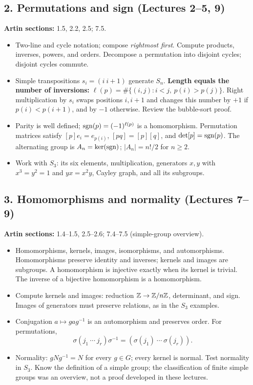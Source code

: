 \documentclass[11pt,reqno]{amsart}
\begin{document}
\subsection*{2. Permutations and sign (Lectures 2--5, 9)}
\noindent\textbf{Artin sections:} 1.5, 2.2, 2.5; 7.5.\par
\begin{itemize}
\item Two-line and cycle notation; compose \emph{rightmost first}.
Compute products, inverses, powers, and orders. Decompose a permutation into disjoint
cycles; disjoint cycles commute.
\item Simple transpositions $s_i=(i\ i+1)$ generate $S_n$.
\textbf{Length equals the number of inversions:}
$\ell(p)=\#\{(i,j):i<j,\ p(i)>p(j)\}$.
Right multiplication by $s_i$ swaps positions $i,i+1$ and changes this number by
$+1$ if $p(i)<p(i+1)$, and by $-1$ otherwise. Review the bubble-sort proof.
\item Parity is well defined; $\operatorname{sgn}(p)=(-1)^{\ell(p)}$ is a homomorphism.
Permutation matrices satisfy $[p]e_i=e_{p(i)}$, $[pq]=[p][q]$, and
$\det[p]=\operatorname{sgn}(p)$. The alternating group is $A_n=\ker(\operatorname{sgn})$;
$|A_n|=n!/2$ for $n\geq2$.
\item Work with $S_3$: its six elements, multiplication, generators
$x,y$ with $x^3=y^2=1$ and $yx=x^2y$, Cayley graph, and all its subgroups.
\end{itemize}

\subsection*{3. Homomorphisms and normality (Lectures 7--9)}
\noindent\textbf{Artin sections:} 1.4--1.5, 2.5--2.6; 7.4--7.5 (simple-group overview).\par
\begin{itemize}
\item Homomorphisms, kernels, images, isomorphisms, and automorphisms.
Homomorphisms preserve identity and inverses; kernels and images are subgroups.
A homomorphism is injective exactly when its kernel is trivial.
The inverse of a bijective homomorphism is a homomorphism.
\item Compute kernels and images: reduction $\mathbb{Z}\to\mathbb{Z}/n\mathbb{Z}$, determinant,
and sign. Images of generators must preserve relations, as in the $S_3$ examples.
\item Conjugation $a\mapsto gag^{-1}$ is an automorphism and preserves order.
For permutations,
\[\sigma(j_1\ \cdots\ j_r)\sigma^{-1}=(\sigma(j_1)\ \cdots\ \sigma(j_r)).\]
\item Normality: $gNg^{-1}=N$ for every $g\in G$; every kernel is normal.
Test normality in $S_3$. Know the definition of a simple group; the classification
of finite simple groups was an overview, not a proof developed in these lectures.
\end{itemize}
\end{document}
